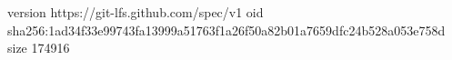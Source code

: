 version https://git-lfs.github.com/spec/v1
oid sha256:1ad34f33e99743fa13999a51763f1a26f50a82b01a7659dfc24b528a053e758d
size 174916
